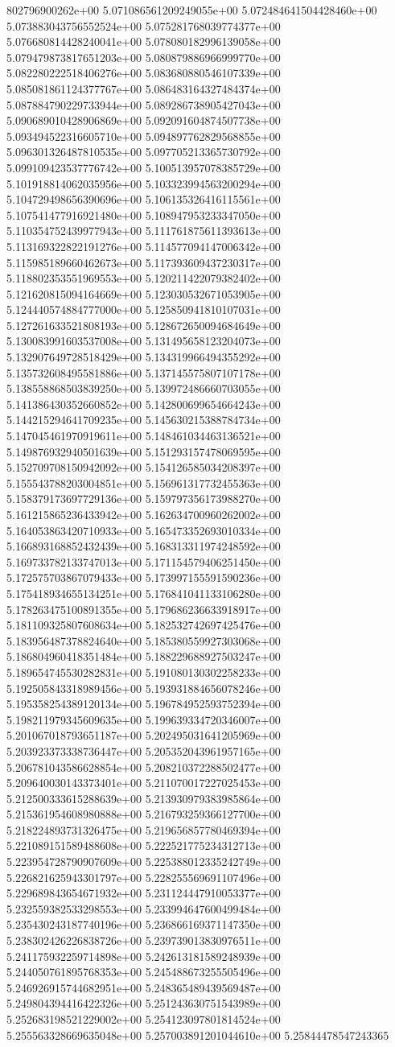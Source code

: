 802796900262e+00	5.071086561209249055e+00	5.072484641504428460e+00	5.073883043756552524e+00	5.075281768039774377e+00	5.076680814428240041e+00	5.078080182996139058e+00	5.079479873817651203e+00	5.080879886966999770e+00	5.082280222518406276e+00	5.083680880546107339e+00	5.085081861124377767e+00	5.086483164327484374e+00	5.087884790229733944e+00	5.089286738905427043e+00	5.090689010428906869e+00	5.092091604874507738e+00	5.093494522316605710e+00	5.094897762829568855e+00	5.096301326487810535e+00	5.097705213365730792e+00	5.099109423537776742e+00	5.100513957078385729e+00	5.101918814062035956e+00	5.103323994563200294e+00	5.104729498656390696e+00	5.106135326416115561e+00	5.107541477916921480e+00	5.108947953233347050e+00	5.110354752439977943e+00	5.111761875611393613e+00	5.113169322822191276e+00	5.114577094147006342e+00	5.115985189660462673e+00	5.117393609437230317e+00	5.118802353551969553e+00	5.120211422079382402e+00	5.121620815094164669e+00	5.123030532671053905e+00	5.124440574884777000e+00	5.125850941810107031e+00	5.127261633521808193e+00	5.128672650094684649e+00	5.130083991603537008e+00	5.131495658123204073e+00	5.132907649728518429e+00	5.134319966494355292e+00	5.135732608495581886e+00	5.137145575807107178e+00	5.138558868503839250e+00	5.139972486660703055e+00	5.141386430352660852e+00	5.142800699654664243e+00	5.144215294641709235e+00	5.145630215388784734e+00	5.147045461970919611e+00	5.148461034463136521e+00	5.149876932940501639e+00	5.151293157478069595e+00	5.152709708150942092e+00	5.154126585034208397e+00	5.155543788203004851e+00	5.156961317732455363e+00	5.158379173697729136e+00	5.159797356173988270e+00	5.161215865236433942e+00	5.162634700960262002e+00	5.164053863420710933e+00	5.165473352693010334e+00	5.166893168852432439e+00	5.168313311974248592e+00	5.169733782133747013e+00	5.171154579406251450e+00	5.172575703867079433e+00	5.173997155591590236e+00	5.175418934655134251e+00	5.176841041133106280e+00	5.178263475100891355e+00	5.179686236633918917e+00	5.181109325807608634e+00	5.182532742697425476e+00	5.183956487378824640e+00	5.185380559927303068e+00	5.186804960418351484e+00	5.188229688927503247e+00	5.189654745530282831e+00	5.191080130302258233e+00	5.192505843318989456e+00	5.193931884656078246e+00	5.195358254389120134e+00	5.196784952593752394e+00	5.198211979345609635e+00	5.199639334720346007e+00	5.201067018793651187e+00	5.202495031641205969e+00	5.203923373338736447e+00	5.205352043961957165e+00	5.206781043586628854e+00	5.208210372288502477e+00	5.209640030143373401e+00	5.211070017227025453e+00	5.212500333615288639e+00	5.213930979383985864e+00	5.215361954608980888e+00	5.216793259366127700e+00	5.218224893731326475e+00	5.219656857780469394e+00	5.221089151589488608e+00	5.222521775234312713e+00	5.223954728790907609e+00	5.225388012335242749e+00	5.226821625943301797e+00	5.228255569691107496e+00	5.229689843654671932e+00	5.231124447910053377e+00	5.232559382533298553e+00	5.233994647600499484e+00	5.235430243187740196e+00	5.236866169371147350e+00	5.238302426226838726e+00	5.239739013830976511e+00	5.241175932259714898e+00	5.242613181589248939e+00	5.244050761895768353e+00	5.245488673255505496e+00	5.246926915744682951e+00	5.248365489439569487e+00	5.249804394416422326e+00	5.251243630751543989e+00	5.252683198521229002e+00	5.254123097801814524e+00	5.255563328669635048e+00	5.257003891201044610e+00	5.25844478547243365